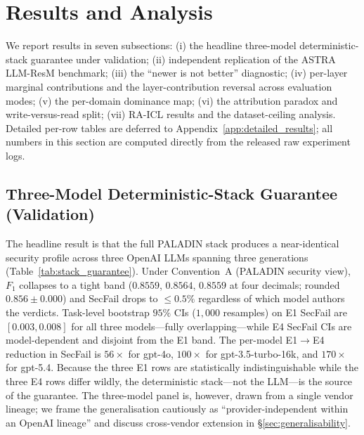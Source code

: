 \documentclass[10pt,a4paper,twocolumn]{article}
\begin{document}
\FloatBarrier
\section{Results and Analysis}
\label{sec:results}

We report results in seven subsections: (i) the headline three-model deterministic-stack guarantee under validation; (ii) independent replication of the ASTRA LLM-ResM benchmark; (iii) the ``newer is not better'' diagnostic; (iv) per-layer marginal contributions and the layer-contribution reversal across evaluation modes; (v) the per-domain dominance map; (vi) the attribution paradox and write-versus-read split; (vii) RA-ICL results and the dataset-ceiling analysis. Detailed per-row tables are deferred to Appendix~\ref{app:detailed_results}; all numbers in this section are computed directly from the released raw experiment logs.

\subsection{Three-Model Deterministic-Stack Guarantee (Validation)}
\label{sec:stack_guarantee}

The headline result is that the full PALADIN stack produces a near-identical security profile across three OpenAI LLMs spanning three generations (Table~\ref{tab:stack_guarantee}). Under Convention~A (PALADIN security view), $F_1$ collapses to a tight band ($0.8559$, $0.8564$, $0.8559$ at four decimals; rounded $0.856\pm 0.000$) and SecFail drops to $\leq 0.5\%$ regardless of which model authors the verdicts. Task-level bootstrap $95\%$ CIs ($1{,}000$ resamples) on E1 SecFail are $[0.003, 0.008]$ for all three models---fully overlapping---while E4 SecFail CIs are model-dependent and disjoint from the E1 band. The per-model E1$\to$E4 reduction in SecFail is $56\times$ for gpt-4o, $100\times$ for gpt-3.5-turbo-16k, and $170\times$ for gpt-5.4. Because the three E1 rows are statistically indistinguishable while the three E4 rows differ wildly, the deterministic stack---not the LLM---is the source of the guarantee. The three-model panel is, however, drawn from a single vendor lineage; we frame the generalisation cautiously as ``provider-independent within an OpenAI lineage'' and discuss cross-vendor extension in \S\ref{sec:generalisability}.
\end{document}

